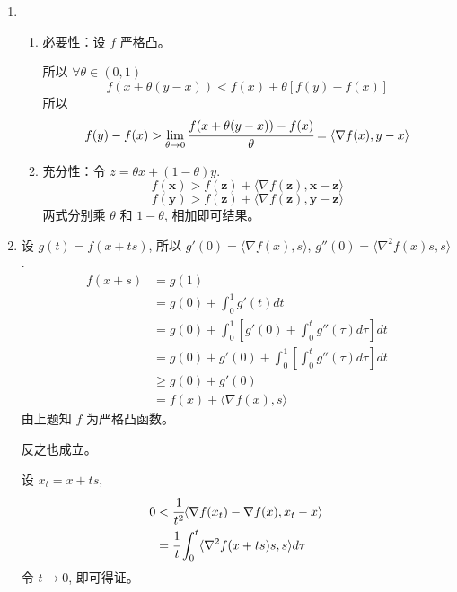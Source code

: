 \documentclass[11pt,letter,notitlepage]{article}
\theoremstyle{definition}
\begin{document}
\begin{solution}
	\begin{enumerate}
		\item \begin{enumerate}
			      \item 必要性：设 $f$ 严格凸。

			            所以 $\forall \theta \in (0,1)$
			            $$f(x+\theta(y-x))<f(x)+\theta [f(y)-f(x)]$$
			            所以
			            $$f(y)-f(x)>\lim_{\theta\to0}\cfrac{f(x+\theta(y-x))-f(x)}{\theta}=\langle \nabla f(x),y-x\rangle$$
			      \item 充分性：令 $z=\theta x+(1-\theta)y$.
			            $$f(\mathbf{x})> f(\mathbf{z})+\langle\nabla f(\mathbf{z}),\mathbf{x}-\mathbf{z}\rangle$$
			            $$f(\mathbf{y})> f(\mathbf{z})+\langle\nabla f(\mathbf{z}),\mathbf{y}-\mathbf{z}\rangle$$
			            两式分别乘 $\theta$ 和 $1-\theta$, 相加即可结果。
		      \end{enumerate}
		\item 设 $g(t)=f(x+ts)$, 所以 $g'(0)=\langle\nabla f(x),s\rangle$, $g''(0)=\langle\nabla^2 f(x)s,s\rangle$.
		      $$\begin{aligned}
				      f(x+s)
				       & =g(1)                                                          \\
				       & =g(0)+\int_0^1 g'(t)dt                                         \\
				       & =g(0)+\int_0^1 \left[ g'(0)+\int_0^t g''(\tau) d\tau \right]dt \\
				       & =g(0)+g'(0)+\int_0^1 \left[\int_0^t g''(\tau) d\tau \right]dt  \\
				       & \geq g(0)+g'(0)                                                \\
				       & = f(x)+\langle\nabla f(x),s\rangle
			      \end{aligned}$$
		      由上题知 $f$ 为严格凸函数。

		      反之也成立。

		      设 $x_t=x+ts$,
		      $$\begin{aligned}
				      0
				       & < \cfrac{1}{t^2} \langle \nabla f(x_t)-\nabla f(x),x_t-x\rangle  \\
				       & =\cfrac{1}{t} \int_0^t \langle \nabla^2 f(x+ts)s,s\rangle d \tau
			      \end{aligned}$$
		      令 $t\to0$, 即可得证。

	\end{enumerate}

\end{solution}
\newpage
\end{document}
